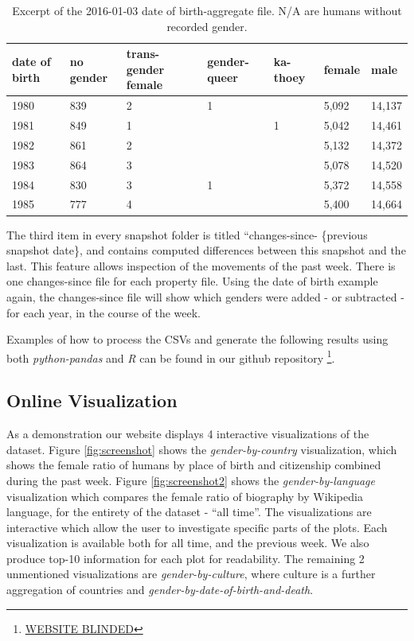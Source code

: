 \documentclass[letterpaper]{article}
\begin{document}
\begin{table}
\caption{Excerpt of the 2016-01-03 date of birth-aggregate file. N/A are humans without recorded gender.}
\begin{tabular} {p{0.8cm}p{0.8cm}p{0.8cm}p{0.8cm}p{0.8cm}p{0.8cm}p{0.8cm}}
\toprule
date of birth & no gender & trans-gender female & gender-queer & ka-thoey & female & male \\
\midrule
1980 & 839 & 2 & 1 & & 5,092 & 14,137   \\ 
1981 & 849 & 1 &  & 1 &5,042 & 14,461 \\ 
1982 & 861 & 2 &  & &5,132 & 14,372  \\ 
1983 & 864 & 3 &  & &5,078 & 14,520  \\ 
1984 & 830 & 3 & 1 & &5,372 & 14,558   \\ 
1985 & 777 & 4 &  & &5,400 & 14,664  \\ 
\bottomrule
\end{tabular}
\label{table:dob}
\end{table}

The third item in every snapshot folder is titled ``changes-since- \{previous snapshot date\}, and contains computed differences between this snapshot and the last. This feature allows inspection of the movements of the past week. There is one changes-since file for each property file. Using the date of birth example again, the changes-since file will show which genders were added - or subtracted - for each year, in the course of the week.

Examples of how to process the CSVs and generate the following results using both \textit{python-pandas} and \textit{R} can be found in our github repository \footnote{\url{WEBSITE BLINDED}}.

\subsection{Online Visualization}
As a demonstration our website displays 4 interactive visualizations of the dataset. Figure \ref{fig:screenshot} shows the \textit{gender-by-country} visualization, which shows the female ratio of humans by place of birth and citizenship combined during the past week. Figure \ref{fig:screenshot2} shows the \textit{gender-by-language} visualization which compares the female ratio of biography by Wikipedia language, for the entirety of the dataset - ``all time''. The visualizations are interactive which allow the user to investigate specific parts of the plots. Each visualization is available both for all time, and the previous week. We also produce top-10 information for each plot for readability. The remaining 2 unmentioned visualizations are \textit{gender-by-culture}, where culture is a further aggregation of countries and \textit{gender-by-date-of-birth-and-death}.
\end{document}
